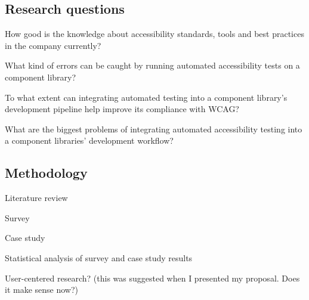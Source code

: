 \documentclass{master_thesis}
\begin{document}
\subsection{Research questions}

	\begin{RQlist}
		\item How good is the knowledge about accessibility standards, tools and best practices in the company currently?
		\item What kind of errors can be caught by running automated accessibility tests on a component library?
		\item To what extent can integrating automated testing into a component library's development pipeline help improve its compliance with WCAG?
		\item What are the biggest problems of integrating automated accessibility testing into a component libraries' development workflow?
	\end{RQlist}

\subsection{Methodology}




\begin{list}{-}{}
	\item Literature review
	\item Survey
	\item Case study
	\item Statistical analysis of survey and case study results
	\item User-centered research? (this was suggested when I presented my proposal. Does it make sense now?)
\end{list}
\end{document}
